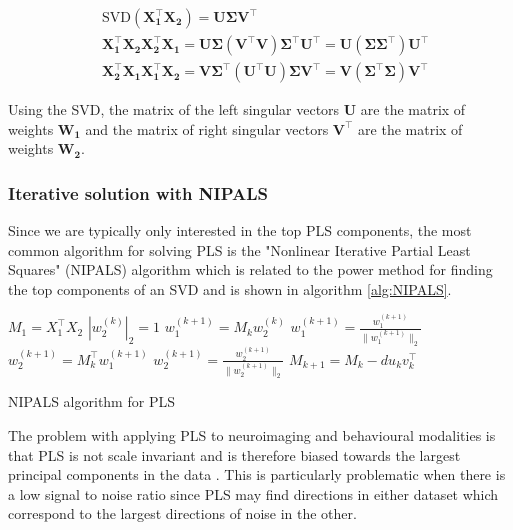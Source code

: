 \begin{align}
     & \text{SVD}(\mathbf{X_1^{\top}X_2})=\mathbf{U\Sigma V^{\top}}                                                              \\
     & \mathbf{X_1^{\top}X_2X_2^{\top}X_1}=\mathbf{U\Sigma (V^{\top} V) \Sigma^{\top} U^{\top}=U(\Sigma \Sigma^{\top}) U^{\top}} \\
     & \mathbf{X_2^{\top}X_1X_1^{\top}X_2}=\mathbf{V\Sigma^{\top} (U^{\top} U) \Sigma V^{\top}=V(\Sigma^{\top} \Sigma) V^{\top}}
\end{align}

Using the SVD, the matrix of the left singular vectors $\mathbf{U}$ are the matrix of weights $\mathbf{W_1}$ and the matrix of right singular vectors $\mathbf{V^{\top}}$ are the matrix of weights $\mathbf{W_2}$.

\subsubsection{Iterative solution with NIPALS}

Since we are typically only interested in the top PLS components, the most common algorithm for solving PLS is the "Nonlinear Iterative Partial Least Squares" (NIPALS) algorithm \cite{wold1966estimation}
which is related to the power method for finding the top components of an SVD and is shown in algorithm \ref{alg:NIPALS}.

\vspace{\baselineskip}
\begin{algorithm}
    \begin{algorithmic}
        \STATE $M_1=X_1^{\top}X_2$
         $|w^{(k)}_2|_2=1$
        \STATE $w^{(k+1)}_1=M_kw^{(k)}_2$
        \STATE $w^{(k+1)}_1=\frac{w^{(k+1)}_1}{\|w^{(k+1)}_1\|_2}$
        \STATE $w^{(k+1)}_2=M_k^{\top}w^{(k+1)}_1$
        \STATE $w^{(k+1)}_2=\frac{w^{(k+1)}_2}{\|w^{(k+1)}_2\|_2}$
        \STATE$M_{k+1}=M_k-du_kv_k^{\top}$
        \ENDWHILE
        \ENDFOR
        \caption[NIPALS for PLS]{NIPALS algorithm for PLS}
        \label{alg:NIPALS}
    \end{algorithmic}
\end{algorithm}

The problem with applying PLS to neuroimaging and behavioural modalities is that PLS is not scale invariant and is therefore biased towards the largest principal components in the data \cite{helmer2020stability}. This is particularly problematic when there is a low signal to noise ratio since PLS may find directions in either dataset which correspond to the largest directions of noise in the other.

